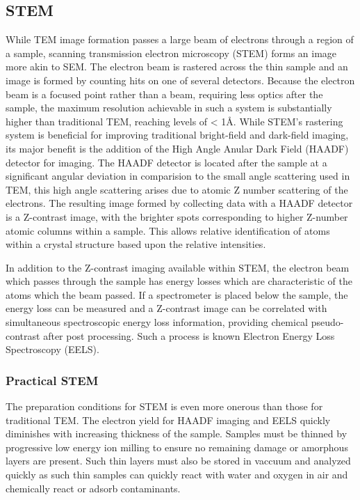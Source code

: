 \subsection{STEM}
While TEM image formation passes a large beam of electrons through a region of a sample, scanning transmission electron microscopy (STEM) forms an image more akin to SEM. The electron beam is rastered across the thin sample and an image is formed by counting hits on one of several detectors. Because the electron beam is a focused point rather than a beam, requiring less optics after the sample, the maximum resolution achievable in such a system is substantially higher than traditional TEM, reaching levels of < 1\AA{}. While STEM's rastering system is beneficial for improving traditional bright-field and dark-field imaging, its major benefit is the addition of the High Angle Anular Dark Field (HAADF) detector for imaging. The HAADF detector is located after the sample at a significant angular deviation in comparision to the small angle scattering used in TEM, this high angle scattering arises due to atomic Z number scattering of the electrons. The resulting image formed by collecting data with a HAADF detector is a Z-contrast image, with the brighter spots corresponding to higher Z-number atomic columns within a sample. This allows relative identification of atoms within a crystal structure based upon the relative intensities.

In addition to the Z-contrast imaging available within STEM, the electron beam which passes through the sample has energy losses which are characteristic of the atoms which the beam passed. If a spectrometer is placed below the sample, the energy loss can be measured and a Z-contrast image can be correlated with simultaneous spectroscopic energy loss information, providing chemical pseudo-contrast after post processing. Such a process is known Electron Energy Loss Spectroscopy (EELS).

\subsubsection{Practical STEM}
The preparation conditions for STEM is even more onerous than those for traditional TEM. The electron yield for HAADF imaging and EELS quickly diminishes with increasing thickness of the sample. Samples must be thinned by progressive low energy ion milling to ensure no remaining damage or amorphous layers are present. Such thin layers must also be stored in vaccuum and analyzed quickly as such thin samples can quickly react with water and oxygen in air and chemically react or adsorb contaminants.

